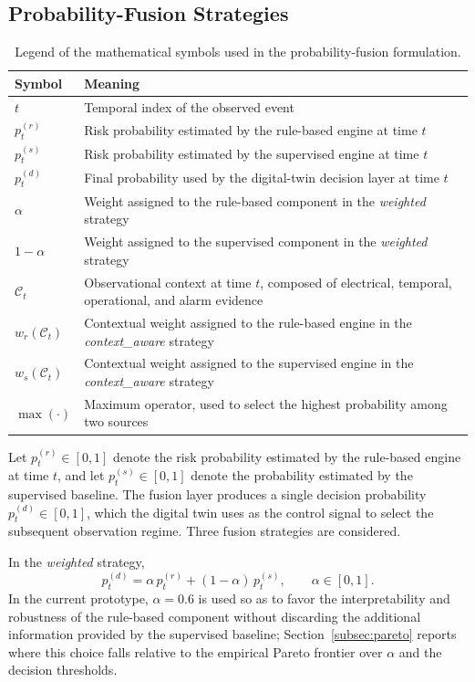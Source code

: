 \documentclass{ieeeaccess}
\begin{document}
\subsection{Probability-Fusion Strategies}
\label{subsec:fusao}
\begin{table}[ht]
\centering
\caption{Legend of the mathematical symbols used in the probability-fusion formulation.}
\label{tab:fusion_symbols}
\begin{tabular}{p{1.3cm} p{6.38cm}}
\hline
\textbf{Symbol} & \textbf{Meaning} \\
\hline
$t$ & Temporal index of the observed event \\
$p_t^{(r)}$ & Risk probability estimated by the rule-based engine at time $t$ \\
$p_t^{(s)}$ & Risk probability estimated by the supervised engine at time $t$ \\
$p_t^{(d)}$ & Final probability used by the digital-twin decision layer at time $t$ \\
$\alpha$ & Weight assigned to the rule-based component in the \textit{weighted} strategy \\
$1-\alpha$ & Weight assigned to the supervised component in the \textit{weighted} strategy \\
$\mathcal{C}_t$ & Observational context at time $t$, composed of electrical, temporal, operational, and alarm evidence \\
$w_r(\mathcal{C}_t)$ & Contextual weight assigned to the rule-based engine in the \textit{context\_aware} strategy \\
$w_s(\mathcal{C}_t)$ & Contextual weight assigned to the supervised engine in the \textit{context\_aware} strategy \\
$\max(\cdot)$ & Maximum operator, used to select the highest probability among two sources \\
\hline
\end{tabular}
\end{table}

Let $p_t^{(r)} \in [0,1]$ denote the risk probability estimated by the rule-based engine at time $t$, and let $p_t^{(s)} \in [0,1]$ denote the probability estimated by the supervised baseline. The fusion layer produces a single decision probability $p_t^{(d)} \in [0,1]$, which the digital twin uses as the control signal to select the subsequent observation regime. Three fusion strategies are considered.

In the \textit{weighted} strategy,
\begin{equation}
p_t^{(d)} = \alpha\, p_t^{(r)} + (1-\alpha)\, p_t^{(s)}, \qquad \alpha \in [0,1].
\label{eq:weighted_fusion}
\end{equation}
In the current prototype, $\alpha = 0.6$ is used so as to favor the interpretability and robustness of the rule-based component without discarding the additional information provided by the supervised baseline; Section~\ref{subsec:pareto} reports where this choice falls relative to the empirical Pareto frontier over $\alpha$ and the decision thresholds.
\end{document}
